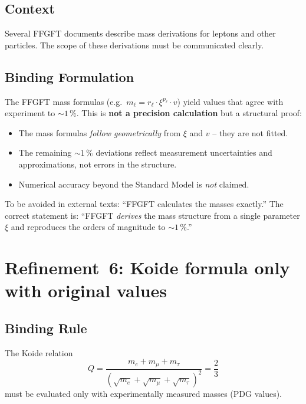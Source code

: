 \subsection*{Context}

Several FFGFT documents describe mass derivations for leptons
and other particles. The scope of these derivations must be
communicated clearly.

\subsection*{Binding Formulation}

The FFGFT mass formulas (e.g.\ $m_\ell = r_\ell \cdot \xi^{p_\ell} \cdot v$)
yield values that agree with experiment to $\sim 1\,\%$.
This is \textbf{not a precision calculation} but a structural proof:

\begin{itemize}
  \item The mass formulas \emph{follow geometrically} from $\xi$ and $v$
    -- they are not fitted.
  \item The remaining $\sim 1\,\%$ deviations reflect
    measurement uncertainties and approximations, not errors in the
    structure.
  \item Numerical accuracy beyond the Standard Model is
    \emph{not} claimed.
\end{itemize}

To be avoided in external texts: \enquote{FFGFT calculates the masses exactly.}
The correct statement is: \enquote{FFGFT \emph{derives} the mass structure from
a single parameter $\xi$ and reproduces the orders of magnitude to $\sim 1\,\%$.}

\section{Refinement~6: Koide formula only with original values}

\subsection*{Binding Rule}

The Koide relation
\begin{equation}
  Q = \frac{m_e + m_\mu + m_\tau}{(\sqrt{m_e}+\sqrt{m_\mu}+\sqrt{m_\tau})^2} = \frac{2}{3}
  \tag{190.11}
\end{equation}
must be evaluated only with experimentally measured masses (PDG values).

